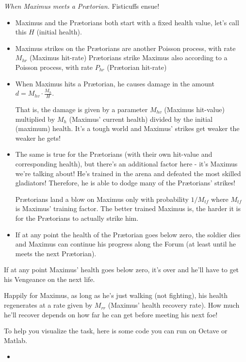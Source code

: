 \begin{redbox}
\emph{When Maximus meets a Pr{\ae}torian.}	
Fisticuffs ensue!

\begin{itemize}
\item Maximus and the Pr{\ae}torians both start with a fixed health value, let's call this $H$ (initial health).
\item Maximus strikes on the Pr{\ae}torians are another Poisson process, with rate $M_{hr}$ (Maximus hit-rate) Pr{\ae}torians strike Maximus also according to a Poisson process, with rate $P_{hr}$ (Pr{\ae}torian hit-rate)
\item When Maximus hits a Pr{\ae}torian, he causes damage in the amount $d=M_{hv} \cdot \frac{M_h}{H}$.

	That is, the damage is given by a parameter $M_{hv}$ (Maximus hit-value) multiplied by $M_h$ (Maximus' current health) divided by the initial (maximum) health. It's a tough world and Maximus' strikes get weaker the weaker he gets!
\item The same is true for the Pr{\ae}torians (with their own hit-value and corresponding health), but there's an additional factor here - it's Maximus we're talking about! He's trained in the arena and defeated the most skilled gladiators! Therefore, he is able to dodge many of the Pr{\ae}torians' strikes!

	Pr{\ae}torians land a blow on Maximus only with probability $1/M_{tf}$ where $M_{tf}$ is Maximus' training factor. The better trained Maximus is, the harder it is for the Pr{\ae}torians to actually strike him.
\item If at any point the health of the Pr{\ae}torian goes below zero, the soldier dies and Maximus can continue his progress along the Forum (at least until he meets the next Pr{\ae}torian).
\end{itemize}
\end{redbox}

If at any point Maximus' health goes below zero, it's over and he'll have to get his Vengeance on the next life.

Happily for Maximus, as long as he's just walking (not fighting), his health regenerates at a rate given by $M_{rr}$ (Maximus' health recovery rate). How much he'll recover depends on how far he can get before meeting his next foe! \\




\newpage
\begin{graybox}
To help you visualize the task, here is some code you can run on Octave or Matlab.
\begin{itemize}
	\item {}
\end{itemize}
\end{graybox}

